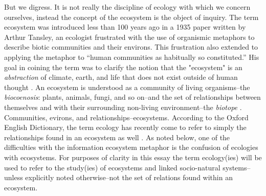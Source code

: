 But we digress. It is not really the discipline of ecology with which we concern ourselves, instead the concept of the ecosystem is the object of inquiry. The term ecosystem was introduced less than 100 years ago in a 1935 paper written by Arthur Tansley, an ecologist frustrated with the use of organismic metaphors to describe biotic communities and their environs. This frustration also extended to applying the metaphor to “human communities as habitually so constituted.” His goal in coining the term was to clarify the notion that the "ecosystem" is an \textit{abstraction} of climate, earth, and life that does not exist outside of human thought \cite{tansley_1935}. An ecosystem is understood as a community of living organisms--the \textit{biocoenosis}: plants, animals, fungi, and so on--and the set of relationships between themselves and with their surrounding non-living environment--the \textit{biotope} \cite{tansley_1935, odum_1953}. Communities, evirons, and relationships--ecosystems. According to the Oxford English Dictionary, the term ecology has recently come to refer to simply the relationships found in an ecosystem as well \cite{oed_2008}. As noted below, one of the difficulties with the information ecosystem metaphor is the confusion of ecologies with ecosystems. For purposes of clarity in this essay the term ecology(ies) will be used to refer to the study(ies) of ecosystems and linked socio-natural systems--unless explicitly noted otherwise--not the set of relations found within an ecosystem. 

